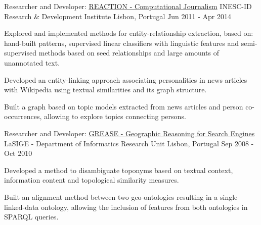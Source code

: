 \begin{cventries}
  \cventry
    {Researcher and Developer: \href{http://arquivo.pt/wayback/20151118124735/http://dmir.inesc-id.pt/project/Reaction}{REACTION - Computational Journalism}} %
    {INESC-ID Research \& Development Institute} %
    {Lisbon, Portugal} %
    {Jun 2011 - Apr 2014} %
    {
      \begin{cvitems} %
        \item {Explored and implemented methods for entity-relationship extraction, based on: hand-built patterns, supervised linear classifiers with linguistic features and semi-supervised methods based on seed relationships and large amounts of unannotated text.}
		\item {Developed an entity-linking approach associating personalities in news articles with Wikipedia using textual similarities and its graph structure.}
        \item {Built a graph based on topic models extracted from news articles and person co-occurrences, allowing to explore topics connecting persons.}
      \end{cvitems}
    }


  \cventry
    {Researcher and Developer: \href{https://arquivo.pt/wayback/20181014115718/http://xldb.di.fc.ul.pt/wiki/Grease}{GREASE - Geographic Reasoning for Search Engines}} %
    {LaSIGE - Department of Informatics Research Unit } %
    {Lisbon, Portugal} %
    {Sep 2008 - Oct 2010} %
    {
      \begin{cvitems} %
        \item {Developed a method to disambiguate toponyms based on textual context, information content and topological similarity measures.}
        \item {Built an alignment method between two geo-ontologies resulting in a single linked-data ontology, allowing the inclusion of features from both ontologies in SPARQL queries.}
      \end{cvitems}
    }


\end{cventries}
